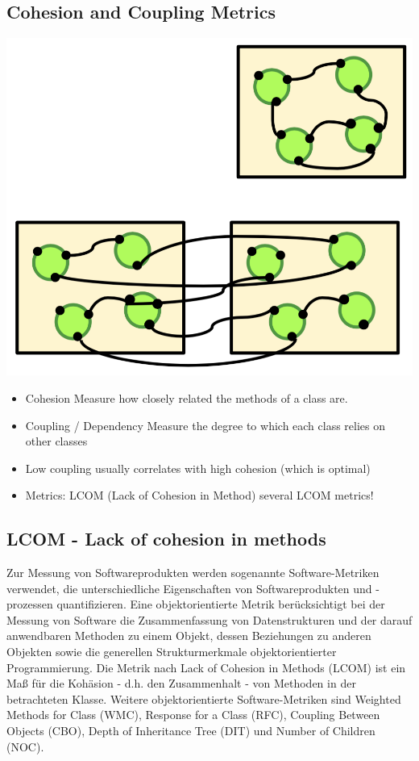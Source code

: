 \documentclass[10pt]{article}
\begin{document}
	\subsection{Cohesion and Coupling Metrics}
	\includegraphics[scale=0.5]{assets/cohesion_coupling.png}
	\begin{itemize}
		\item Cohesion
			\subitem Measure how closely related the methods of a class are.
		\item Coupling / Dependency
			\subitem Measure the degree to which each class relies on other classes
		\item Low coupling usually correlates with high cohesion (which is optimal)
		\item Metrics: LCOM (Lack of Cohesion in Method) several LCOM metrics!
	\end{itemize}
	
	\subsection{LCOM -  Lack of cohesion in methods}
	Zur Messung von Softwareprodukten werden sogenannte Software-Metriken verwendet, die unterschiedliche Eigenschaften von Softwareprodukten und -prozessen quantifizieren. Eine objektorientierte Metrik berücksichtigt bei der Messung von Software die Zusammenfassung von Datenstrukturen und der darauf anwendbaren Methoden zu einem Objekt, dessen Beziehungen zu anderen Objekten sowie die generellen Strukturmerkmale objektorientierter Programmierung.
	Die Metrik nach Lack of Cohesion in Methods (LCOM) ist ein Maß für die Kohäsion - d.h. den Zusammenhalt - von Methoden in der betrachteten Klasse. Weitere objektorientierte Software-Metriken sind Weighted Methods for Class (WMC), Response for a Class (RFC), Coupling Between Objects (CBO), Depth of Inheritance Tree (DIT) und Number of Children (NOC).
\end{document}
